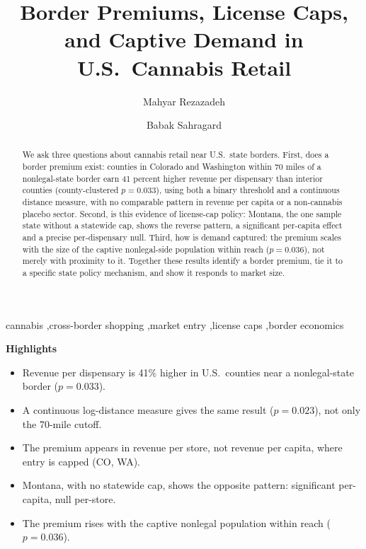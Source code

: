 \documentclass[5p]{elsarticle}
\begin{document}
\begin{frontmatter}

\title{Border Premiums, License Caps, and Captive Demand in U.S.\ Cannabis Retail}

\author[1]{Mahyar Rezazadeh}
\author[1]{Babak Sahragard}
\address[1]{Department of Economics}

\begin{abstract}
We ask three questions about cannabis retail near U.S.\ state borders. First, does a border premium exist:
counties in Colorado and Washington within 70 miles of a nonlegal-state border earn 41 percent higher revenue
per dispensary than interior counties (county-clustered $p=0.033$), using both a binary threshold and a
continuous distance measure, with no comparable pattern in revenue per capita or a non-cannabis placebo
sector. Second, is this evidence of license-cap policy: Montana, the one sample state without a statewide
cap, shows the reverse pattern, a significant per-capita effect and a precise per-dispensary null. Third, how
is demand captured: the premium scales with the size of the captive nonlegal-side population within reach
($p=0.036$), not merely with proximity to it. Together these results identify a border premium, tie it to a
specific state policy mechanism, and show it responds to market size.
\end{abstract}

\begin{keyword}
cannabis \sep cross-border shopping \sep market entry \sep license caps \sep border economics
\end{keyword}

\end{frontmatter}

\noindent\textbf{Highlights}
\begin{itemize}
\item Revenue per dispensary is 41\% higher in U.S.\ counties near a nonlegal-state border ($p=0.033$).
\item A continuous log-distance measure gives the same result ($p=0.023$), not only the 70-mile cutoff.
\item The premium appears in revenue per store, not revenue per capita, where entry is capped (CO, WA).
\item Montana, with no statewide cap, shows the opposite pattern: significant per-capita, null per-store.
\item The premium rises with the captive nonlegal population within reach ($p=0.036$).
\end{itemize}
\end{document}
